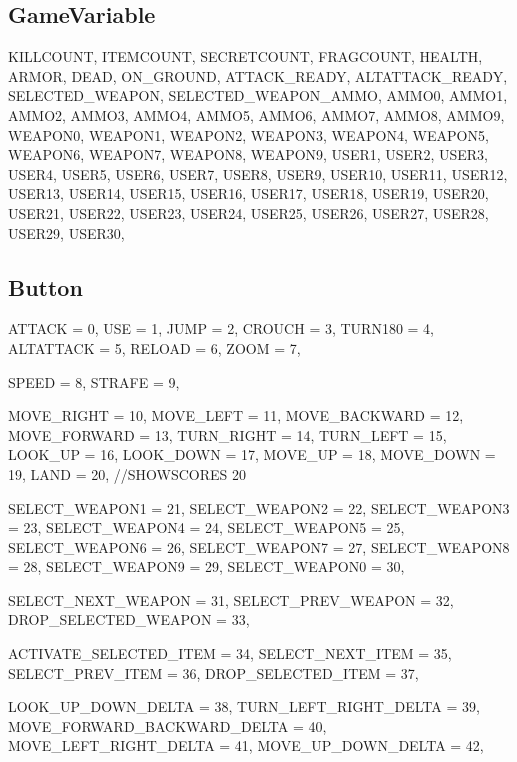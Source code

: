 \subsection{GameVariable}
\begin{clinee}
KILLCOUNT,
        ITEMCOUNT,
        SECRETCOUNT,
        FRAGCOUNT,
        HEALTH,
        ARMOR,
        DEAD,
        ON_GROUND,
        ATTACK_READY,
        ALTATTACK_READY,
        SELECTED_WEAPON,
        SELECTED_WEAPON_AMMO,
        AMMO0,
        AMMO1,
        AMMO2,
        AMMO3,
        AMMO4,
        AMMO5,
        AMMO6,
        AMMO7,
        AMMO8,
        AMMO9,
        WEAPON0,
        WEAPON1,
        WEAPON2,
        WEAPON3,
        WEAPON4,
        WEAPON5,
        WEAPON6,
        WEAPON7,
        WEAPON8,
        WEAPON9,
        USER1,
        USER2,
        USER3,
        USER4,
        USER5,
        USER6,
        USER7,
        USER8,
        USER9,
        USER10,
        USER11,
        USER12,
        USER13,
        USER14,
        USER15,
        USER16,
        USER17,
        USER18,
        USER19,
        USER20,
        USER21,
        USER22,
        USER23,
        USER24,
        USER25,
        USER26,
        USER27,
        USER28,
        USER29,
        USER30,
\end{clinee}
\subsection{Button}
\begin{clinee}
ATTACK = 0,
        USE = 1,
        JUMP = 2,
        CROUCH = 3,
        TURN180 = 4,
        ALTATTACK = 5,
        RELOAD = 6,
        ZOOM = 7,

        SPEED = 8,
        STRAFE = 9,

        MOVE_RIGHT = 10,
        MOVE_LEFT = 11,
        MOVE_BACKWARD = 12,
        MOVE_FORWARD = 13,
        TURN_RIGHT = 14,
        TURN_LEFT = 15,
        LOOK_UP = 16,
        LOOK_DOWN = 17,
        MOVE_UP = 18,
        MOVE_DOWN = 19,
        LAND = 20,
        //SHOWSCORES 20

        SELECT_WEAPON1 = 21,
        SELECT_WEAPON2 = 22,
        SELECT_WEAPON3 = 23,
        SELECT_WEAPON4 = 24,
        SELECT_WEAPON5 = 25,
        SELECT_WEAPON6 = 26,
        SELECT_WEAPON7 = 27,
        SELECT_WEAPON8 = 28,
        SELECT_WEAPON9 = 29,
        SELECT_WEAPON0 = 30,

        SELECT_NEXT_WEAPON = 31,
        SELECT_PREV_WEAPON = 32,
        DROP_SELECTED_WEAPON = 33,

        ACTIVATE_SELECTED_ITEM = 34,
        SELECT_NEXT_ITEM = 35,
        SELECT_PREV_ITEM = 36,
        DROP_SELECTED_ITEM = 37,

        LOOK_UP_DOWN_DELTA = 38,
        TURN_LEFT_RIGHT_DELTA = 39,
        MOVE_FORWARD_BACKWARD_DELTA = 40,
        MOVE_LEFT_RIGHT_DELTA = 41,
        MOVE_UP_DOWN_DELTA = 42,
\end{clinee}
